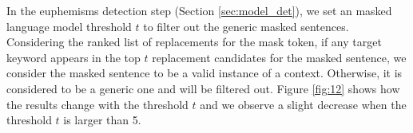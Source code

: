 In the euphemisms detection step (Section \ref{sec:model_det}), we set an masked language model threshold $t$ to filter out the generic masked sentences. 
Considering the ranked list of replacements for the mask token, if any target keyword appears in the top $t$ replacement candidates for the masked sentence, we consider  the masked sentence to be a valid instance of a context. Otherwise, it is considered to be a generic one and will be filtered out. 
Figure \ref{fig:12} shows how the results change with the threshold $t$ and we observe a slight decrease when the threshold $t$ is larger than 5. 



















